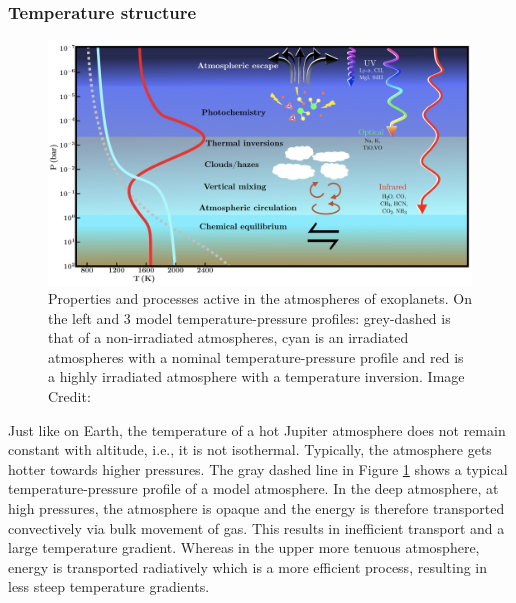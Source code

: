 
\subsubsection{Temperature structure}


\begin{figure}
    \centering
    \includegraphics[width = \linewidth]{TPandeffects.png}
    \caption{Properties and processes active in the atmospheres of exoplanets. On the left and 3 model temperature-pressure profiles: grey-dashed is that of a non-irradiated atmospheres, cyan is an irradiated atmospheres with a nominal temperature-pressure profile and red is a highly irradiated atmosphere with a temperature inversion. Image Credit: \citep{Madhusudhan2019}}
    \label{int:fig:TPs}
\end{figure}

Just like on Earth, the temperature of a hot Jupiter atmosphere does not remain constant with altitude, i.e., it is not isothermal. Typically, the atmosphere gets hotter towards higher pressures. The gray dashed line in Figure \ref{int:fig:TPs} shows a typical temperature-pressure profile of a model atmosphere. In the deep atmosphere, at high pressures, the atmosphere is opaque and the energy is therefore transported convectively via bulk movement of gas. This results in inefficient transport and a large temperature gradient. Whereas in the upper more tenuous atmosphere, energy is transported radiatively which is a more efficient process, resulting in less steep temperature gradients.

